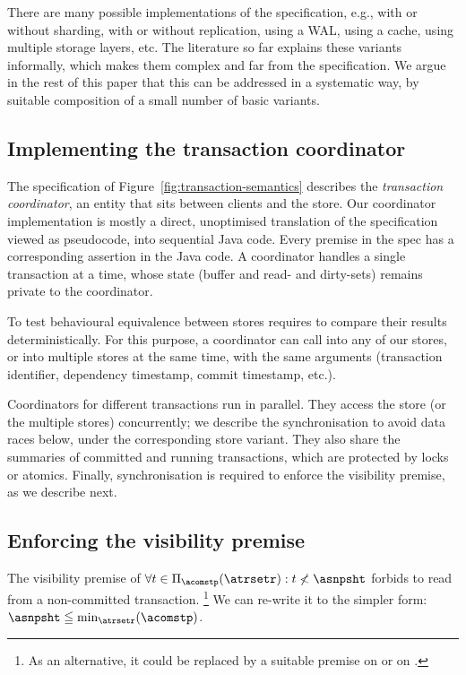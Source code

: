 There are many possible implementations of the specification, e.g., with
or without sharding, with or without replication, using a WAL, using a
cache, using multiple storage layers, etc.
The literature so far explains these variants informally, which makes
them complex and far from the specification.
We argue in the rest of this paper that this can be addressed in a
systematic way, by suitable composition of a small number of basic
variants.

\subsection{Implementing the transaction coordinator}
\label{sec:coordinator}

The specification of Figure~\ref{fig:transaction-semantics} describes
the \emph{transaction coordinator}, an entity that sits between clients
and the store.
Our coordinator implementation is mostly a direct, unoptimised
translation of the specification viewed as pseudocode, into sequential
Java code.
Every premise in the spec has a corresponding assertion in the Java code.
A coordinator handles a single transaction at a time, whose state
(buffer and read- and dirty-sets) remains private to the coordinator.

To test behavioural equivalence between stores requires to
compare their results deterministically.
For this purpose, a coordinator can call into any of our stores, or into
multiple stores at the same time, with the same arguments (transaction
identifier, dependency timestamp, commit timestamp, etc.).

Coordinators for different transactions run in parallel.
They access the store (or the multiple stores) concurrently; we describe
the synchronisation to avoid data races below, under the corresponding
store variant.
They also share the summaries of committed and running transactions,
which are protected by locks or atomics.
Finally, synchronisation is required to enforce the visibility premise,
as we describe next.

\subsection{Enforcing the visibility premise}
\label{sec:enforce-visibility}

The visibility premise of \starttxnrule{} $\forall t \in
\Pi_{\acomstp}(\atrsetr): t \not< \asnpsht$ forbids to read from a
non-committed transaction.%
% 
%
\footnote{
%
  As an alternative, it could be replaced by a suitable premise on
  \commitrule{} or on \initkeyrule{}.
}
%
We can re-write it to the simpler form: $\asnpsht \leqq
\min_{\atrsetr}(\acomstp)$.
%

